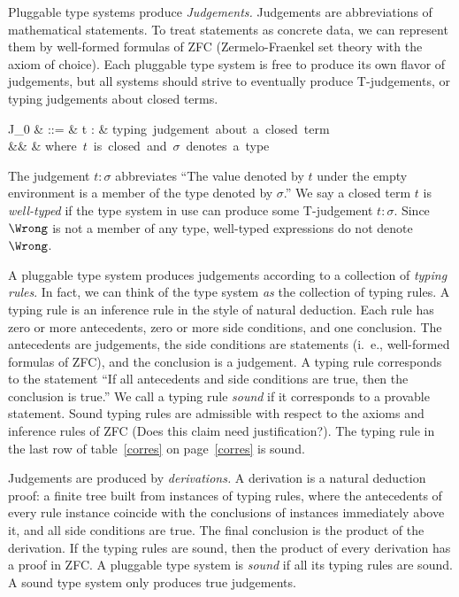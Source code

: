 \documentclass{amsart}
\theoremstyle{definition}
\begin{document}
Pluggable type systems produce \emph{Judgements.} Judgements are
abbreviations of mathematical statements. To treat statements as
concrete data, we can represent them by well-formed formulas of
ZFC (Zermelo-Fraenkel set theory with the axiom of choice). Each
pluggable type system is free to produce its own flavor of
judgements, but all systems should strive to eventually produce
T-judgements, or typing judgements about closed terms.
\begin{syntax}
J_0
& ::=
& t : \sigma
   & \mbox{typing judgement about a closed term} \\
&& & \mbox{where $t$ is closed and $\sigma$ denotes a type}
\end{syntax}%
The judgement $t:\sigma$ abbreviates ``The value denoted by $t$
under the empty environment is a member of the type denoted by
$\sigma$.'' We say a closed term $t$ is \emph{well-typed} if the
type system in use can produce some T-judgement $t:\sigma$.
Since $\Wrong$ is not a member of any type, well-typed
expressions do not denote $\Wrong$.

A pluggable type system produces judgements according to a
collection of \emph{typing rules}. In fact, we can think of the
type system \emph{as} the collection of typing rules. A typing
rule is an inference rule in the style of natural deduction. Each
rule has zero or more antecedents, zero or more side conditions,
and one conclusion. The antecedents are judgements, the side
conditions are statements (i.~e., well-formed formulas of ZFC),
and the conclusion is a judgement. A typing rule corresponds to
the statement ``If all antecedents and side conditions are true,
then the conclusion is true.'' We call a typing rule \emph{sound}
if it corresponds to a provable statement. Sound typing rules are
admissible with respect to the axioms and inference rules of ZFC
(Does this claim need justification?). The typing rule in the
last row of table~\ref{corres} on page~\ref{corres} is sound.

Judgements are produced by \emph{derivations.} A derivation is a
natural deduction proof: a finite tree built from instances of
typing rules, where the antecedents of every rule instance
coincide with the conclusions of instances immediately above it,
and all side conditions are true. The final conclusion is the
product of the derivation. If the typing rules are sound, then
the product of every derivation has a proof in ZFC. A pluggable
type system is \emph{sound} if all its typing rules are sound. A
sound type system only produces true judgements.
\end{document}
